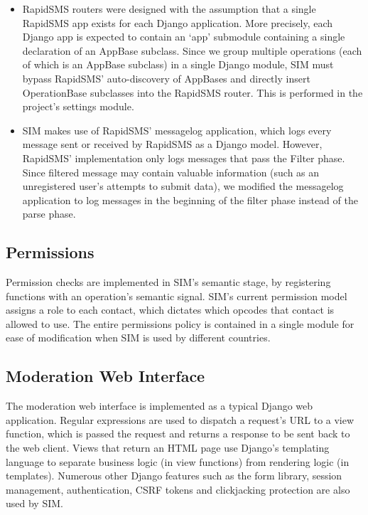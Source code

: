 \documentclass{acm_proc_article-sp}
\begin{document}
\begin{itemize}
\item RapidSMS routers were designed with the assumption that a single RapidSMS app exists for each Django application. More precisely, each Django app is expected to contain an ‘app’ submodule containing a single declaration of an AppBase subclass. Since we group multiple operations (each of which is an AppBase subclass) in a single Django module, SIM must bypass RapidSMS’ auto-discovery of AppBases and directly insert OperationBase subclasses into the RapidSMS router. This is performed in the project’s settings module.
\item SIM makes use of RapidSMS’ messagelog application, which logs every message sent or received by RapidSMS as a Django model. However, RapidSMS’ implementation only logs messages that pass the Filter phase. Since filtered message may contain valuable information (such as an unregistered user’s attempts to submit data), we modified the messagelog application to log messages in the beginning of the filter phase instead of the parse phase.
\end{itemize}

\subsection{Permissions}

Permission checks are implemented in SIM’s semantic stage, by registering functions with an operation’s semantic signal. SIM’s current permission model assigns a role to each contact, which dictates which opcodes that contact is allowed to use. The entire permissions policy is contained in a single module for ease of modification when SIM is used by different countries.

\subsection{Moderation Web Interface}

The moderation web interface is implemented as a typical Django web application. Regular expressions are used to dispatch a request’s URL to a view function, which is passed the request and returns a response to be sent back to the web client. Views that return an HTML page use Django’s templating language to separate business logic (in view functions) from rendering logic (in templates). Numerous other Django features such as the form library, session management, authentication, CSRF tokens and clickjacking protection are also used by SIM.
\end{document}
